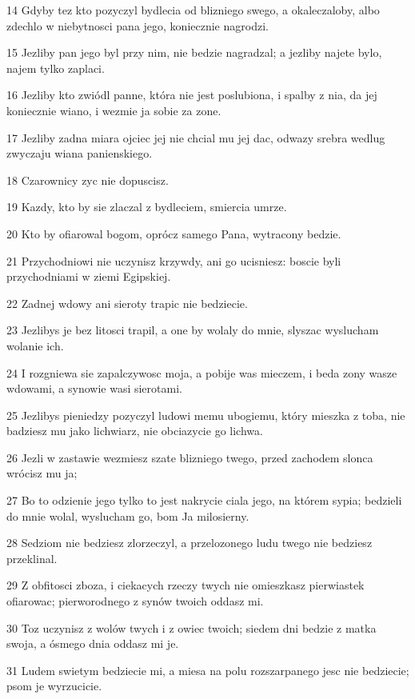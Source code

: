 \par 14 Gdyby tez kto pozyczyl bydlecia od blizniego swego, a okaleczaloby, albo zdechlo w niebytnosci pana jego, koniecznie nagrodzi.
\par 15 Jezliby pan jego byl przy nim, nie bedzie nagradzal; a jezliby najete bylo, najem tylko zaplaci.
\par 16 Jezliby kto zwiódl panne, która nie jest poslubiona, i spalby z nia, da jej koniecznie wiano, i wezmie ja sobie za zone.
\par 17 Jezliby zadna miara ojciec jej nie chcial mu jej dac, odwazy srebra wedlug zwyczaju wiana panienskiego.
\par 18 Czarownicy zyc nie dopuscisz.
\par 19 Kazdy, kto by sie zlaczal z bydleciem, smiercia umrze.
\par 20 Kto by ofiarowal bogom, oprócz samego Pana, wytracony bedzie.
\par 21 Przychodniowi nie uczynisz krzywdy, ani go ucisniesz: boscie byli przychodniami w ziemi Egipskiej.
\par 22 Zadnej wdowy ani sieroty trapic nie bedziecie.
\par 23 Jezlibys je bez litosci trapil, a one by wolaly do mnie, slyszac wyslucham wolanie ich.
\par 24 I rozgniewa sie zapalczywosc moja, a pobije was mieczem, i beda zony wasze wdowami, a synowie wasi sierotami.
\par 25 Jezlibys pieniedzy pozyczyl ludowi memu ubogiemu, który mieszka z toba, nie badziesz mu jako lichwiarz, nie obciazycie go lichwa.
\par 26 Jezli w zastawie wezmiesz szate blizniego twego, przed zachodem slonca wrócisz mu ja;
\par 27 Bo to odzienie jego tylko to jest nakrycie ciala jego, na którem sypia; bedzieli do mnie wolal, wyslucham go, bom Ja milosierny.
\par 28 Sedziom nie bedziesz zlorzeczyl, a przelozonego ludu twego nie bedziesz przeklinal.
\par 29 Z obfitosci zboza, i ciekacych rzeczy twych nie omieszkasz pierwiastek ofiarowac; pierworodnego z synów twoich oddasz mi.
\par 30 Toz uczynisz z wolów twych i z owiec twoich; siedem dni bedzie z matka swoja, a ósmego dnia oddasz mi je.
\par 31 Ludem swietym bedziecie mi, a miesa na polu rozszarpanego jesc nie bedziecie; psom je wyrzucicie.

